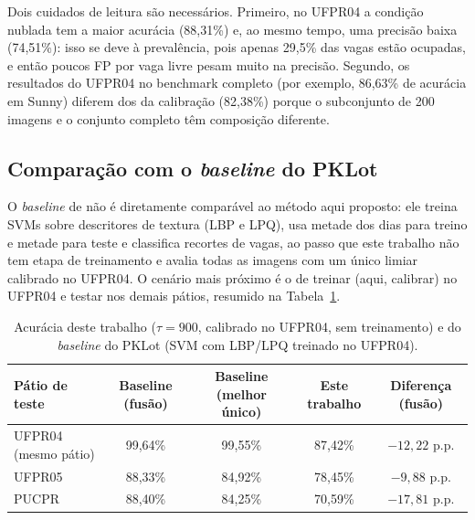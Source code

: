 \documentclass[
	article,			%
	11pt,				%
	oneside,			%
	a4paper,			%
	english,			%
	brazil,				%
	sumario=tradicional
	]{abntex2}
\begin{document}
Dois cuidados de leitura são necessários. Primeiro, no UFPR04 a condição nublada tem a maior acurácia (88,31\%) e, ao mesmo tempo, uma precisão baixa (74,51\%): isso se deve à prevalência, pois apenas 29,5\% das vagas estão ocupadas, e então poucos FP por vaga livre pesam muito na precisão. Segundo, os resultados do UFPR04 no benchmark completo (por exemplo, 86,63\% de acurácia em Sunny) diferem dos da calibração (82,38\%) porque o subconjunto de 200 imagens e o conjunto completo têm composição diferente.

\subsection{Comparação com o \textit{baseline} do PKLot}
\label{sec:comparacao}

O \textit{baseline} de  não é diretamente comparável ao método aqui proposto: ele treina SVMs sobre descritores de textura (LBP e LPQ), usa metade dos dias para treino e metade para teste e classifica recortes de vagas, ao passo que este trabalho não tem etapa de treinamento e avalia todas as imagens com um único limiar calibrado no UFPR04. O cenário mais próximo é o de treinar (aqui, calibrar) no UFPR04 e testar nos demais pátios, resumido na Tabela~\ref{tab:comparacao}.

\begin{table}[htbp]
\centering
\caption{Acurácia deste trabalho ($\tau=900$, calibrado no UFPR04, sem treinamento) e do \textit{baseline} do PKLot (SVM com LBP/LPQ treinado no UFPR04).}
\label{tab:comparacao}
\small
\begin{tabular}{lcccc}
\toprule
\textbf{Pátio de teste} & \textbf{Baseline (fusão)} & \textbf{Baseline (melhor único)} & \textbf{Este trabalho} & \textbf{Diferença (fusão)} \\
\midrule
UFPR04 (mesmo pátio) & 99,64\% & 99,55\% & 87,42\% & $-12{,}22$ p.p. \\
UFPR05               & 88,33\% & 84,92\% & 78,45\% & $-9{,}88$ p.p. \\
PUCPR                & 88,40\% & 84,25\% & 70,59\% & $-17{,}81$ p.p. \\
\bottomrule
\end{tabular}
\end{table}
\end{document}
